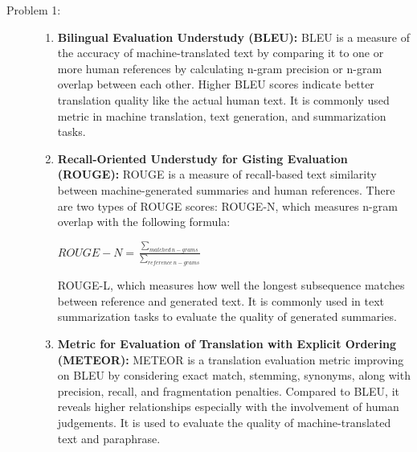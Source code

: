 \documentclass[10pt]{article}
\begin{document}
\begin{description}
\item[Problem 1:]  \hfill %

\begin{enumerate}

    \item \textbf{Bilingual Evaluation Understudy (BLEU):} BLEU is a measure of the accuracy of machine-translated text by comparing it to one or more human references by calculating
    n-gram precision or n-gram overlap between each other. Higher BLEU scores indicate better translation quality like the actual human text.
    It is commonly used metric in machine translation, text generation, and summarization tasks.
    
    \item \textbf{Recall-Oriented Understudy for Gisting Evaluation (ROUGE):} ROUGE is a measure of recall-based text similarity between machine-generated summaries and human references.
    There are two types of ROUGE scores: ROUGE-N, which measures n-gram overlap with the following formula:

    \begin{center}
        $\displaystyle{ROUGE-N = \frac{\sum_{matched\ n-grams}}{\sum_{reference\ n-grams}}}$
    \end{center}
    
    ROUGE-L, which measures how well the longest subsequence matches between reference and generated text.
    It is commonly used in text summarization tasks to evaluate the quality of generated summaries.
    
    \item \textbf{Metric for Evaluation of Translation with Explicit Ordering (METEOR):} METEOR is a translation evaluation metric improving on BLEU by considering 
    exact match, stemming, synonyms, along with precision, recall, and fragmentation penalties. Compared to BLEU, it reveals higher relationships especially with the 
    involvement of human judgements. It is used to evaluate the quality of machine-translated text and paraphrase.
    

\end{enumerate}
\end{description}
\end{document}

